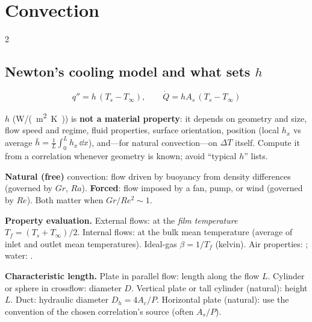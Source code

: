 \section{Convection}\label{sec:convection}
\begin{multicols}{2}
\subsection{Newton's cooling model and what sets \texorpdfstring{$h$}{h}}\label{sec:newton}
\CORE{}
\begin{formulabox}
\begin{equation}
q''=h\,(T_s-T_\infty),\qquad \dot Q=hA_s\,(T_s-T_\infty) \label{F:transfer:newton}
\end{equation}
\end{formulabox}
$h$ (\si{W/(m^2.K)}) is \textbf{not a material property}: it depends on geometry and size, flow speed and regime, fluid properties, surface orientation, position (local $h_x$ vs average $\bar h=\frac1L\int_0^Lh_x\,\dd x$), and---for natural convection---on $\Delta T$ itself. Compute it from a correlation whenever geometry is known; avoid ``typical $h$'' lists.

\textbf{Natural (free)} convection: flow driven by buoyancy from density differences (governed by $Gr$, $Ra$). \textbf{Forced}: flow imposed by a fan, pump, or wind (governed by $Re$). Both matter when $Gr/Re^2\sim1$.

\textbf{Property evaluation.} External flows: at the \emph{film temperature} $T_f=(T_s+T_\infty)/2$. Internal flows: at the bulk mean temperature (average of inlet and outlet mean temperatures). Ideal-gas $\beta=1/T_f$ (kelvin). Air properties: ; water: .

\textbf{Characteristic length.} Plate in parallel flow: length along the flow $L$. Cylinder or sphere in crossflow: diameter $D$. Vertical plate or tall cylinder (natural): height $L$. Duct: hydraulic diameter $D_h=4A_c/P$. Horizontal plate (natural): use the convention of the chosen correlation's source (often $A_s/P$).


\end{multicols}

